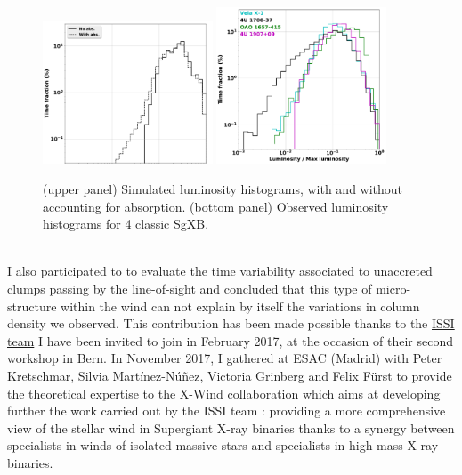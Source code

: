 \documentclass[a4paper,12pt,onecolumn]{article}
\makeatletter
\newcommand{\sgx}{SgXB\xspace}
\newcommand*{\rlof}{RLOF\@\xspace}
\makeatother
\begin{document}
\begin{figure}
\vspace*{-0.2cm}
\captionsetup[subfigure]{labelformat=empty}
\centering
\includegraphics[width=0.45\textwidth]{Figures/lum_diag.pdf}
\includegraphics[width=0.45\textwidth]{Figures/obs_diag.pdf}
\caption{(upper panel) Simulated luminosity histograms, with and without accounting for absorption. (bottom panel) Observed luminosity histograms for 4 classic \sgx \citep[from][]{ElMellah}.} \label{fig:diag}
\end{figure} 
\phantom{m}\\
\indent I also participated to \cite{Grinberg2017} to evaluate the time variability associated to unaccreted clumps passing by the line-of-sight and concluded that this type of micro-structure within the wind can not explain by itself the variations in column density we observed. This contribution has been made possible thanks to the \href{http://www.issibern.ch/teams/stellarwindxray/}{ISSI team} I have been invited to join in February 2017, at the occasion of their second workshop in Bern. In November 2017, I gathered at ESAC (Madrid) with Peter Kretschmar, Silvia Mart\'{i}nez-N\'{u}\~{n}ez, Victoria Grinberg and Felix F\"{u}rst to provide the theoretical expertise to the X-Wind collaboration which aims at developing further the work carried out by the ISSI team : providing a more comprehensive view of the stellar wind in Supergiant X-ray binaries thanks to a synergy between specialists in winds of isolated massive stars and specialists in high mass X-ray binaries.\\ \\
\end{document}
